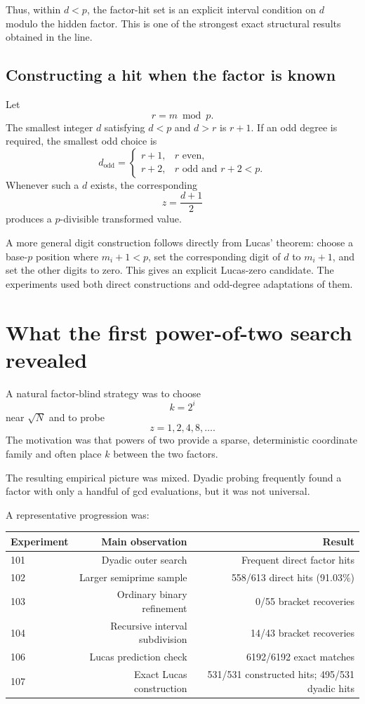 \documentclass[11pt,a4paper]{article}
\newcommand{\Arith}{\mathrm{ArithSeg}}
\begin{document}
Thus, within $d<p$, the factor-hit set is an explicit interval condition on $d$ modulo the hidden factor. This is one of the strongest exact structural results obtained in the \Arith{} line.

\subsection{Constructing a hit when the factor is known}

Let
\[
r=m\bmod p.
\]
The smallest integer $d$ satisfying $d<p$ and $d>r$ is $r+1$. If an odd degree is required, the smallest odd choice is
\begin{equation}
 d_{\mathrm{odd}}=
 \begin{cases}
 r+1,&r\text{ even},\\
 r+2,&r\text{ odd and }r+2<p.
 \end{cases}
\label{eq:smallest-odd}
\end{equation}
Whenever such a $d$ exists, the corresponding
\[
z=\frac{d+1}{2}
\]
produces a $p$-divisible transformed value.

A more general digit construction follows directly from Lucas' theorem: choose a base-$p$ position where $m_i+1<p$, set the corresponding digit of $d$ to $m_i+1$, and set the other digits to zero. This gives an explicit Lucas-zero candidate. The experiments used both direct constructions and odd-degree adaptations of them.

\section{What the first power-of-two search revealed}
\label{sec:dyadic}

A natural factor-blind strategy was to choose
\[
k=2^i
\]
near $\sqrt N$ and to probe
\[
z=1,2,4,8,\ldots.
\]
The motivation was that powers of two provide a sparse, deterministic coordinate family and often place $k$ between the two factors.

The resulting empirical picture was mixed. Dyadic probing frequently found a factor with only a handful of gcd evaluations, but it was not universal.

A representative progression was:
\begin{center}
\begin{tabular}{lrr}
\toprule
Experiment & Main observation & Result \\
\midrule
101 & Dyadic outer search & Frequent direct factor hits \\
102 & Larger semiprime sample & 558/613 direct hits (91.03\%) \\
103 & Ordinary binary refinement & 0/55 bracket recoveries \\
104 & Recursive interval subdivision & 14/43 bracket recoveries \\
106 & Lucas prediction check & 6192/6192 exact matches \\
107 & Exact Lucas construction & 531/531 constructed hits; 495/531 dyadic hits \\
\bottomrule
\end{tabular}
\end{center}
\end{document}
